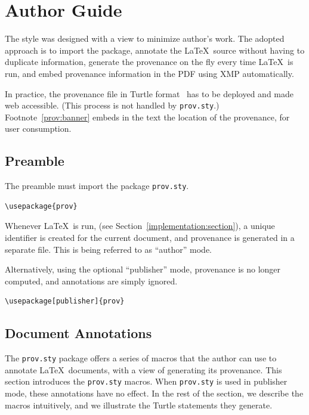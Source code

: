 \documentclass{sigplanconf}
\newcommand{\provsty}{{\tt prov.sty}\xspace}
\begin{document}
\section{Author Guide}

The style was designed with a view to minimize author's work. The
adopted approach is to import the package, annotate the \LaTeX\ source
without having to duplicate information, generate the provenance on
the fly every time \LaTeX\ is run, and embed provenance information in
the PDF using XMP automatically.

In practice, the provenance file in Turtle
format~\cite{Lebo:prov-o:20130430} has to be deployed and made web
accessible. (This process is not handled by \provsty.)
Footnote~\ref{prov:banner} embeds in the text the location of the
provenance, for user consumption.



\subsection{Preamble}

The preamble must import the package \provsty.
\begin{verbatim}
\usepackage{prov}
\end{verbatim}
Whenever \LaTeX\ is run, (see Section~\ref{implementation:section}), a
unique identifier is created for the current document, and provenance
is generated in a separate file. This is being referred to as ``author'' mode.

Alternatively, using the optional ``publisher'' mode, provenance is no
longer computed, and annotations are simply ignored.

\begin{verbatim}
\usepackage[publisher]{prov}
\end{verbatim}


\subsection{Document Annotations}\label{annotations:section}

The \provsty package offers a series of macros that the author can use
to annotate \LaTeX\ documents, with a view of generating its \PROV
provenance. This section introduces the \provsty macros.  When
\provsty is used in publisher mode, these annotations have no
effect. In the rest of the section, we describe the macros
intuitively, and we illustrate the Turtle statements they generate.
\end{document}
